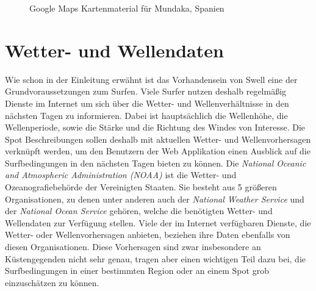 \begin{figure}[h]
  \caption{Google Maps Kartenmaterial für Mundaka, Spanien}
  \label{google-maps}
\end{figure}

\section{Wetter- und Wellendaten}
\label{sec:Wetter- und Wellendaten}

Wie schon in der Einleitung erwähnt ist das Vorhandensein von Swell
eine der Grundvoraussetzungen zum Surfen. Viele Surfer nutzen deshalb
regelmäßig Dienste im Internet um sich über die Wetter- und
Wellenverhältnisse in den nächsten Tagen zu informieren. Dabei ist
hauptsächlich die Wellenhöhe, die Wellenperiode, sowie die Stärke und
die Richtung des Windes von Interesse. Die Spot Beschreibungen sollen
deshalb mit aktuellen Wetter- und Wellenvorhersagen verknüpft werden,
um den Benutzern der Web Applikation einen Ausblick auf die
Surfbedingungen in den nächsten Tagen bieten zu können. Die
\textit{National Oceanic and Atmospheric Administration (NOAA)} ist
die Wetter- und Ozeanografiebehörde der Vereinigten Staaten. Sie
besteht aus 5 größeren Organisationen, zu denen unter anderen auch der
\textit{National Weather Service} und der \textit{National Ocean
  Service} gehören, welche die benötigten Wetter- und Wellendaten zur
Verfügung stellen. Viele der im Internet verfügbaren Dienste, die
Wetter- oder Wellenvorhersagen anbieten, beziehen ihre Daten ebenfalls
von diesen Organisationen. Diese Vorhersagen sind zwar insbesondere an
Küstengegenden nicht sehr genau, tragen aber einen wichtigen Teil dazu
bei, die Surfbedingungen in einer bestimmten Region oder an einem Spot
grob einzuschätzen zu können.

